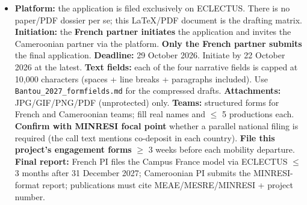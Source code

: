 \documentclass[11pt,a4paper]{article}
\begin{document}
\begin{itemize}
    \item \textbf{Platform:} the application is filed exclusively on ECLECTUS. There is no paper/PDF dossier per se; this LaTeX/PDF document is the drafting matrix.
    \textbf{Initiation:} the \textbf{French partner initiates} the application and invites the Cameroonian partner via the platform.
    \textbf{Only the French partner submits} the final application.
    \textbf{Deadline:} 29 October 2026. Initiate by 22 October 2026 at the latest.
    \textbf{Text fields:} each of the four narrative fields is capped at 10,000 characters (spaces + line breaks + paragraphs included). Use \texttt{Bantou\_2027\_formfields.md} for the compressed drafts.
    \textbf{Attachments:} JPG/GIF/PNG/PDF (unprotected) only.
    \textbf{Teams:} structured forms for French and Cameroonian teams; fill real names and $\leq$ 5 productions each.
    \textbf{Confirm with MINRESI focal point} whether a parallel national filing is required (the call text mentions co-deposit in each country).
    \textbf{File this project's engagement forms} $\geq$ 3 weeks before each mobility departure.
    \textbf{Final report:} French PI files the Campus France model via ECLECTUS $\leq$ 3 months after 31 December 2027; Cameroonian PI submits the MINRESI-format report; publications must cite MEAE/MESRE/MINRESI + project number.
\end{itemize}
\end{document}
